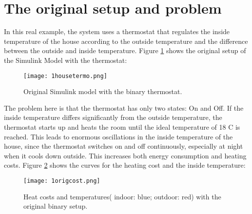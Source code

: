 \section{The original setup and problem}
\label{problem}
In this real example, the system uses a thermostat that regulates the inside temperature of the house according to the outside temperature and the difference between the outside and inside temperature. Figure \ref{housetermo} shows the original setup of the Simulink Model with the thermostat:
\begin{figure}[H]
	\centering
	\texttt{[image: 1housetermo.png]}
	\caption[Caption for LOF]{Original Simulink model with the binary thermostat.}
	\label{housetermo}
\end{figure}
The problem here is that the thermostat has only two states: On and Off. If the inside temperature differs significantly from the outside temperature, the thermostat starts up and heats the room until the ideal temperature of 18 C is reached. This leads to enormous oscillations in the inside temperature of the house, since the thermostat switches on and off continuously, especially at night when it cools down outside. This increases both energy consumption and heating costs. Figure \ref{origcost} shows the curves for the heating cost and the inside temperature:
\begin{figure}[H]
	\centering
	\texttt{[image: 1origcost.png]}
	\caption[Caption for LOF]{Heat costs and temperatures( indoor: blue; outdoor: red) with the original binary setup.}
	\label{origcost}
\end{figure}
